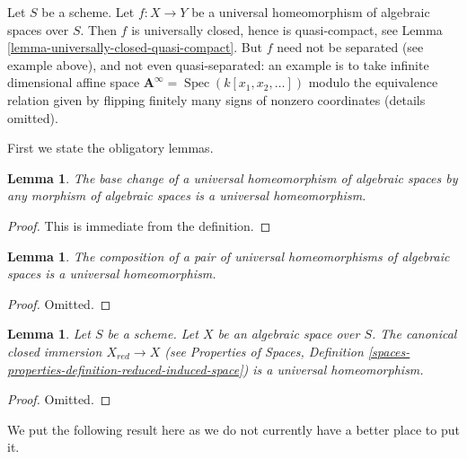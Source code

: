 \documentclass{stacks-project}
\theoremstyle{plain}
\newtheorem{lemma}[subsection]{Lemma}
\theoremstyle{definition}
\theoremstyle{remark}
\numberwithin{equation}{subsection}
\def\Spec{\mathop{\mathrm{Spec}}}
\begin{document}
\noindent
Let $S$ be a scheme.
Let $f : X \to Y$ be a universal homeomorphism of algebraic spaces
over $S$. Then $f$ is universally closed, hence is quasi-compact, see
Lemma \ref{lemma-universally-closed-quasi-compact}.
But $f$ need not be separated (see example above), and not even
quasi-separated: an example is to take infinite dimensional affine
space $\mathbf{A}^\infty = \Spec(k[x_1, x_2, \ldots])$ modulo
the equivalence relation given by flipping finitely many signs of
nonzero coordinates (details omitted).

\medskip\noindent
First we state the obligatory lemmas.

\begin{lemma}
\label{lemma-base-change-universal-homeomorphism}
The base change of a universal homeomorphism of algebraic spaces
by any morphism of algebraic spaces is a universal homeomorphism.
\end{lemma}

\begin{proof}
This is immediate from the definition.
\end{proof}

\begin{lemma}
\label{lemma-composition-universal-homeomorphism}
The composition of a pair of universal homeomorphisms of
algebraic spaces is a universal homeomorphism.
\end{lemma}

\begin{proof}
Omitted.
\end{proof}

\begin{lemma}
\label{lemma-reduction-universal-homeomorphism}
Let $S$ be a scheme. Let $X$ be an algebraic space over $S$.
The canonical closed immersion $X_{red} \to X$ (see
Properties of Spaces, Definition
\ref{spaces-properties-definition-reduced-induced-space})
is a universal homeomorphism.
\end{lemma}

\begin{proof}
Omitted.
\end{proof}

\noindent
We put the following result here as we do not currently have a better
place to put it.
\end{document}
